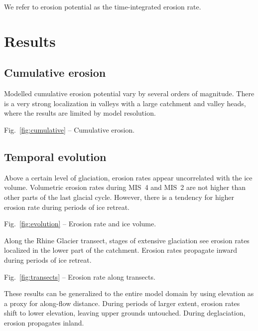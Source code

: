 \documentclass[utf8]{article}
\begin{document}
    We refer to erosion potential as the time-integrated erosion rate.

\section{Results}

\subsection{Cumulative erosion}

    Modelled cumulative erosion potential vary by several orders of magnitude.
    There is a very strong localization in valleys with a large catchment and
    valley heads, where the results are limited by model resolution.

    Fig.~\ref{fig:cumulative} -- Cumulative erosion.

\subsection{Temporal evolution}

    Above a certain level of glaciation, erosion rates appear uncorrelated with
    the ice volume. Volumetric erosion rates during MIS~4 and MIS~2 are not
    higher than other parts of the last glacial cycle. However, there is a
    tendency for higher erosion rate during periods of ice retreat.

    Fig.~\ref{fig:evolution} -- Erosion rate and ice volume.

    Along the Rhine Glacier transect, stages of extensive glaciation see
    erosion rates localized in the lower part of the catchment. Erosion rates
    propagate inward during periods of ice retreat.

    Fig.~\ref{fig:transects} -- Erosion rate along transects.

    These results can be generalized to the entire model domain by using
    elevation as a proxy for along-flow distance. During periods of larger
    extent, erosion rates shift to lower elevation, leaving upper grounds
    untouched. During deglaciation, erosion propagates inland.
\end{document}
